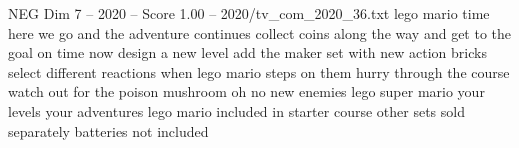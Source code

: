 \begin{textsample}{NEG Dim 7 – 2020 – Score 1.00 – 2020/tv\_com\_2020\_36.txt}  \label{ex:f7_neg_011}
lego mario time here we go and the adventure continues collect coins along the way and get to the goal on time now design a new level add the maker set with new action bricks select different reactions when lego mario steps on them hurry through the course watch out for the poison mushroom oh no new enemies lego super mario your levels your adventures lego mario included in starter course other sets sold separately batteries not included

\end{textsample}
